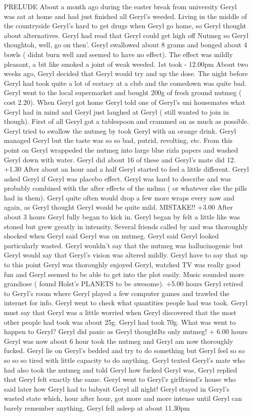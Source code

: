 \documentclass[12pt]{book}
\begin{document}
PRELUDE About a month ago during the easter break from university Geryl was sat at home and had just finished all Geryl's weeded. Living in the middle of the countryside Geryl's hard to get drugs when Geryl go home, so Geryl thought about alternatives. Geryl had read that Geryl could get high off Nutmeg so Geryl thoughtoh, well, go on then'. Geryl swallowed about 8 grams and bonged about 4 bowls ( didnt burn well and seemed to have no effect). The effect was mildly pleasant, a bit like smoked a joint of weak weeded. 1st took - 12.00pm About two weeks ago, Geryl decided that Geryl would try and up the dose. The night before Geryl had took quite a lot of ecstacy at a club and the comedown was quite bad. Geryl went to the local supermarket and bought 200g of fresh ground nutmeg ( cost 2.20). When Geryl got home Geryl told one of Geryl's uni housemates what Geryl had in mind and Geryl just laughed at Geryl ( still wanted to join in though). First of all Geryl got a tablespoon and crammed on as much as possible. Geryl tried to swallow the nutmeg by took Geryl with an orange drink. Geryl managed Geryl but the taste was so so bad, putrid, revolting, etc. From this point on Geryl wrappeded the nutmeg into large blue rizla papers and washed Geryl down with water. Geryl did about 16 of these and Geryl's mate did 12. +1.30 After about an hour and a half Geryl started to feel a little different. Geryl asked Geryl if Geryl was placebo effect. Geryl was hard to describe and was probably combined with the after effects of the mdma ( or whatever else the pills had in them). Geryl quite often would drop a few more wraps every now and again, as Geryl thought Geryl would be quite mild. MISTAKE!! +3.00 After about 3 hours Geryl fully began to kick in. Geryl began by felt a little like was stoned but grew greatly in intensity. Several friends called by and was thoroughly shocked when Geryl said Geryl was on nutmeg. Geryl said Geryl looked particularly wasted. Geryl wouldn't say that the nutmeg was hallucinogenic but Geryl would say that Geryl's vision was altered mildly. Geryl have to say that up to this point Geryl was thoroughly enjoyed Geryl, watched TV was really good fun and Geryl seemed to be able to get into the plot easily. Music sounded more grandiose ( found Holst's PLANETS to be awesome). +5.00 hours Geryl retired to Geryl's room where Geryl played a few computer games and trawled the internet for info. Geryl went to check what quantities people had was took. Geryl must say that Geryl was a little worried when Geryl discovered that the most other people had took was about 25g. Geryl had took 70g. What was went to happen to Geryl? Geryl did panic as Geryl thoughtIts only nutmeg! + 6.00 hours Geryl was now about 6 hour took the nutmeg and Geryl am now thoroughly fucked. Geryl lie on Geryl's bedded and try to do something but Geryl feel so so so so so tired with little capacity to do anything. Geryl texted Geryl's mate who had also took the nutmeg and told Geryl how fucked Geryl was, Geryl replied that Geryl felt exactly the same. Geryl went to Geryl's girlfriend's house who said later how Geryl had to babysit Geryl all night! Geryl stayed in Geryl's wasted state which, hour after hour, got more and more intense until Geryl can barely remember anything. Geryl fell asleep at about 11.30pm 
\end{document}
